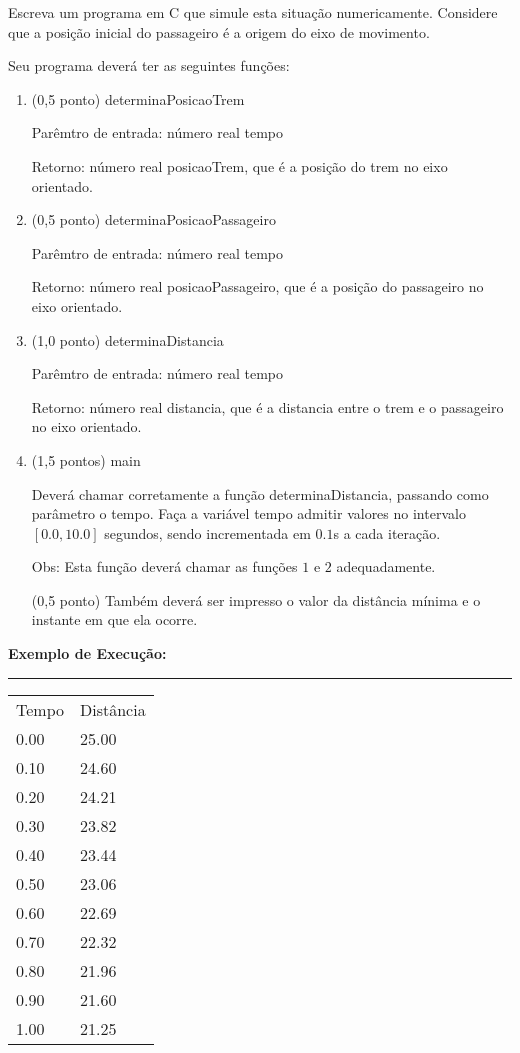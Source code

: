 \documentclass[12pt,a4paper]{article}
\begin{document}
Escreva um programa em C que simule esta situação numericamente. Considere que a posição inicial do passageiro é a origem do 
eixo de movimento.

Seu programa deverá ter as seguintes funções:
\vspace{0.4cm}
\begin{enumerate}
\item (0,5 ponto) determinaPosicaoTrem

Parêmtro de entrada: número real tempo

Retorno: número real posicaoTrem, que é a posição do trem no eixo orientado.
\vspace{0.2cm}
\item (0,5 ponto) determinaPosicaoPassageiro

Parêmtro de entrada: número real tempo

Retorno: número real posicaoPassageiro, que é a posição do passageiro no eixo orientado.
\vspace{0.2cm}
\item (1,0 ponto) determinaDistancia

Parêmtro de entrada: número real tempo

Retorno: número real distancia, que é a distancia entre o trem e o passageiro no eixo orientado.
\vspace{0.2cm}
\item (1,5 pontos) main

Deverá chamar corretamente a função determinaDistancia, passando como parâmetro o tempo. Faça a variável tempo admitir 
valores no intervalo$[0.0 , 10.0]$ segundos, sendo incrementada em $0.1$s a cada iteração.

Obs: Esta função deverá chamar as funções $1$ e $2$ adequadamente.

(0,5 ponto) Também deverá ser impresso o valor da distância mínima e o instante em que ela ocorre.
\vspace{3cm}
\end{enumerate}

\textbf{Exemplo de Execução:}

\rule{12cm}{0.01cm}

\begin{tabular}{ll}
Tempo & Distância \\
0.00 & 25.00 \\
0.10 & 24.60 \\
0.20 & 24.21 \\ 
0.30 & 23.82 \\
0.40 & 23.44 \\
0.50 & 23.06 \\
0.60 & 22.69 \\
0.70 & 22.32 \\
0.80 & 21.96 \\
0.90 & 21.60 \\
1.00 & 21.25 \\
\end{tabular}\\
\end{document}
